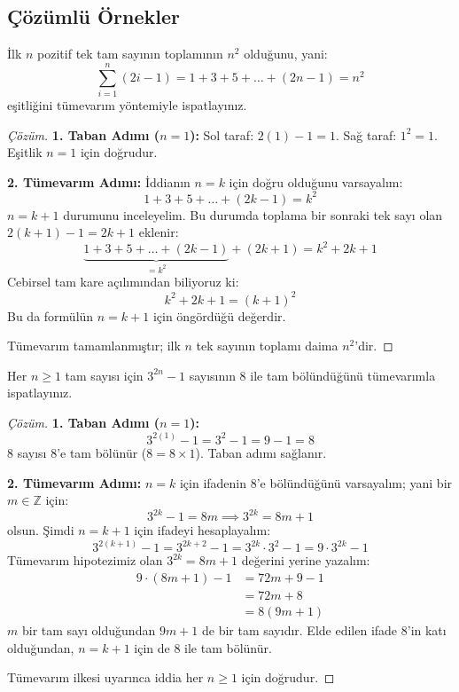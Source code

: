 \subsection{Çözümlü Örnekler}

\begin{example}
İlk $n$ pozitif tek tam sayının toplamının $n^2$ olduğunu, yani:
\[ \sum_{i=1}^n (2i - 1) = 1 + 3 + 5 + \dots + (2n - 1) = n^2 \]
eşitliğini tümevarım yöntemiyle ispatlayınız.
\end{example}
\begin{proof}[Çözüm]
\textbf{1. Taban Adımı ($n = 1$):}
Sol taraf: $2(1) - 1 = 1$.
Sağ taraf: $1^2 = 1$.
Eşitlik $n = 1$ için doğrudur.

\textbf{2. Tümevarım Adımı:}
İddianın $n = k$ için doğru olduğunu varsayalım:
\[ 1 + 3 + 5 + \dots + (2k - 1) = k^2 \]
$n = k+1$ durumunu inceleyelim. Bu durumda toplama bir sonraki tek sayı olan $2(k+1) - 1 = 2k + 1$ eklenir:
\[ \underbrace{1 + 3 + 5 + \dots + (2k - 1)}_{= k^2} + (2k + 1) = k^2 + 2k + 1 \]
Cebirsel tam kare açılımından biliyoruz ki:
\[ k^2 + 2k + 1 = (k+1)^2 \]
Bu da formülün $n = k+1$ için öngördüğü değerdir.

Tümevarım tamamlanmıştır; ilk $n$ tek sayının toplamı daima $n^2$'dir.
\end{proof}

\begin{example}
Her $n \ge 1$ tam sayısı için $3^{2n} - 1$ sayısının $8$ ile tam bölündüğünü tümevarımla ispatlayınız.
\end{example}
\begin{proof}[Çözüm]
\textbf{1. Taban Adımı ($n = 1$):}
\[ 3^{2(1)} - 1 = 3^2 - 1 = 9 - 1 = 8 \]
$8$ sayısı $8$'e tam bölünür ($8 = 8 \times 1$). Taban adımı sağlanır.

\textbf{2. Tümevarım Adımı:}
$n = k$ için ifadenin $8$'e bölündüğünü varsayalım; yani bir $m \in \mathbb{Z}$ için:
\[ 3^{2k} - 1 = 8m \implies 3^{2k} = 8m + 1 \]
olsun. Şimdi $n = k+1$ için ifadeyi hesaplayalım:
\[ 3^{2(k+1)} - 1 = 3^{2k + 2} - 1 = 3^{2k} \cdot 3^2 - 1 = 9 \cdot 3^{2k} - 1 \]
Tümevarım hipotezimiz olan $3^{2k} = 8m + 1$ değerini yerine yazalım:
\begin{align*}
9 \cdot (8m + 1) - 1 &= 72m + 9 - 1 \\
&= 72m + 8 \\
&= 8(9m + 1)
\end{align*}
$m$ bir tam sayı olduğundan $9m + 1$ de bir tam sayıdır. Elde edilen ifade $8$'in katı olduğundan, $n = k+1$ için de $8$ ile tam bölünür.

Tümevarım ilkesi uyarınca iddia her $n \ge 1$ için doğrudur.
\end{proof}

